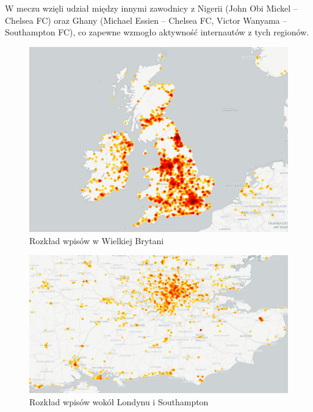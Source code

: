 W meczu wzięli udział między innymi zawodnicy z Nigerii (John Obi Mickel -- Chelsea FC)
oraz Ghany (Michael Essien -- Chelsea FC, Victor Wanyama -- Southampton FC),
co zapewne wzmogło aktywność internautów z tych regionów.


\begin{figure}[ht!]
\centering
\includegraphics[width=140mm]{img/geo-uk-chelsea-southampton-light.png}
\caption{Rozkład wpisów w Wielkiej Brytani}
\label{image:mapa-uk}
\end{figure}

\begin{figure}[ht!]
\centering
\includegraphics[width=140mm]{img/geo-uk-zoom-chelsea-southampton-light.png}
\caption{Rozkład wpisów wokół Londynu i Southampton}
\label{image:mapa-uk-zoom}
\end{figure}

